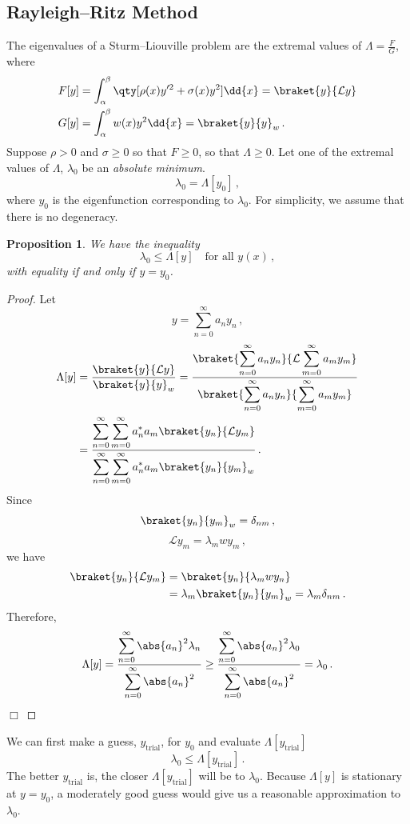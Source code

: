\documentclass{article}
\theoremstyle{plain}\theoremheaderfont{\normalfont\itshape}\theorembodyfont{\rmfamily}\theoremseparator{.}\newtheorem*{rem}{Remark}\newtheorem*{ex}{Example}\newtheorem*{proof}{Proof}\newtheorem*{altp}{Alternative proof}
\theoremstyle{plain}\theoremheaderfont{\normalfont\bfseries}\theorembodyfont{\rmfamily}\theoremseparator{.}\newtheorem{thm}{Theorem}[section]\newtheorem{lem}[thm]{Lemma}\newtheorem{prop}[thm]{Proposition}\newtheorem*{cor}{Corollary}\newtheorem{defn}[thm]{Definition}\newtheorem{clm}[thm]{Claim}\newtheorem{clminproof}{Claim}
\theoremstyle{break}\theoremheaderfont{\normalfont\itshape}\theorembodyfont{\rmfamily}\theoremseparator{.\medskip}\newtheorem*{proofskip}{Proof}\newtheorem*{exs}{Examples}\newtheorem*{rems}{Remarks}
\theoremstyle{break}\theoremheaderfont{\normalfont\bfseries}\theorembodyfont{\rmfamily}\theoremseparator{.\medskip}\newtheorem{lemskip}[thm]{Lemma}\newtheorem{defnskip}[thm]{Definition}\newtheorem{propskip}[thm]{Proposition}\newtheorem{thmskip}[thm]{Theorem}
\numberwithin{equation}{section}
\newcommand{\qed}{\hfill\ensuremath{\Box}}
\begin{document}
	\subsection{Rayleigh--Ritz Method}
	The eigenvalues of a Sturm--Liouville problem are the extremal values of \(\Lambda=\frac{F}{G}\), where
	\begin{align*}
		F[y]&=\int_{\alpha}^{\beta}\qty[\rho(x)y'^2+\sigma(x)y^2]\dd{x}=\braket{y}{\mathcal{L}y}\\
		G[y]&=\int_{\alpha}^{\beta}w(x)y^2\dd{x}=\braket{y}{y}_w\,.
	\end{align*}
	Suppose \(\rho>0\) and \(\sigma\ge 0\) so that \(F\ge 0\), so that \(\Lambda\ge 0\). Let one of the extremal values of \(\Lambda\), \(\lambda_0\) be an \textit{absolute minimum}.
	\[\lambda_0=\Lambda[y_0]\,,\]
	where \(y_0\) is the eigenfunction corresponding to \(\lambda_0\). For simplicity, we assume that there is no degeneracy.
	\begin{prop}
		We have the inequality
		\[\lambda_0\le\Lambda[y]\quad\text{for all }y(x)\,,\]
		with equality if and only if \(y=y_0\).
	\end{prop}
	\begin{proof}
		Let
		\[y=\sum_{n=0}^{\infty}a_n y_n\,,\]
		\begin{align*}
			\Lambda[y]&=\frac{\braket{y}{\mathcal{L}y}}{\braket{y}{y}_w}=\frac{\displaystyle\braket{\sum_{n=0}^{\infty}a_ny_n}{\mathcal{L}\sum_{m=0}^{\infty}a_my_m}}{\displaystyle\braket{\sum_{n=0}^{\infty}a_ny_n}{\sum_{m=0}^{\infty}a_my_m}}\\
			&=\frac{\displaystyle\sum_{n=0}^{\infty}\sum_{m=0}^{\infty}a_n^*a_m\braket{y_n}{\mathcal{L}y_m}}{\displaystyle\sum_{n=0}^{\infty}\sum_{m=0}^{\infty}a_n^*a_m\braket{y_n}{y_m}_w}\,.
		\end{align*}
		Since
		\[\braket{y_n}{y_m}_w=\delta_{nm}\,,\]
		\[\mathcal{L}y_m=\lambda_m wy_m\,,\]
		we have
		\begin{align*}
			\braket{y_n}{\mathcal{L}y_m}&=\braket{y_n}{\lambda_m wy_n}\\
			&=\lambda_m\braket{y_n}{y_m}_w=\lambda_m\delta_{nm}\,.
		\end{align*}
		Therefore,
		\[\Lambda[y]=\frac{\displaystyle\sum_{n=0}^{\infty}\abs{a_n}^2\lambda_n}{\displaystyle\sum_{n=0}^{\infty}\abs{a_n}^2}\ge\frac{\displaystyle\sum_{n=0}^{\infty}\abs{a_n}^2\lambda_0}{\displaystyle\sum_{n=0}^{\infty}\abs{a_n}^2}=\lambda_0\,.\]\qed
	\end{proof}

	We can first make a guess, \(y_\text{trial}\), for \(y_0\) and evaluate \(\Lambda[y_\text{trial}]\)
	\[\lambda_0\le\Lambda[y_\text{trial}]\,.\]
	The better \(y_\text{trial}\) is, the closer \(\Lambda[y_\text{trial}]\) will be to \(\lambda_0\). Because \(\Lambda[y]\) is stationary at \(y=y_0\), a moderately good guess would give us a reasonable approximation to \(\lambda_0\).
\end{document}
